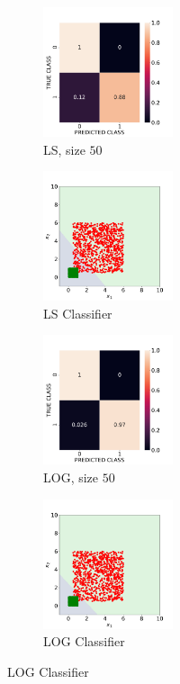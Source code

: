 \documentclass[12pt, a4 paper]{article}
\begin{document}
\begin{figure}[!htbp]
    \begin{subfigure}[!htbp]{0.2\textwidth}
       \centering
       \includegraphics[width=1.5in]{../results/ex1/acc_LS_dataset_Uniform_size_50.pdf}
       \caption{LS, size $50$}
       \label{fig:LS_P1a_50}
    \end{subfigure}
\quad
    \begin{subfigure}[!htbp]{0.2\textwidth}
       \centering
       \includegraphics[width=1.5in]{../results/ex1/samples_LS_dataset_Uniform_size_50.pdf}
       \caption{LS Classifier}
       \label{fig:LSD_P1a_50}
    \end{subfigure}
\quad
    \begin{subfigure}[!htbp]{0.2\textwidth}
       \centering
       \includegraphics[width=1.5in]{../results/ex1/acc_LOG_dataset_Uniform_size_50.pdf}
       \caption{LOG, size $50$}
       \label{fig:LOG_P1a_50}
    \end{subfigure}
\quad
    \begin{subfigure}[!htbp]{0.2\textwidth}
       \centering
       \includegraphics[width=1.5in]{../results/ex1/samples_LOG_dataset_Uniform_size_50.pdf}
       \caption{LOG Classifier}
       \label{fig:LOGD_P1a_50}
    \end{subfigure}
    

\end{figure}
\end{document}
